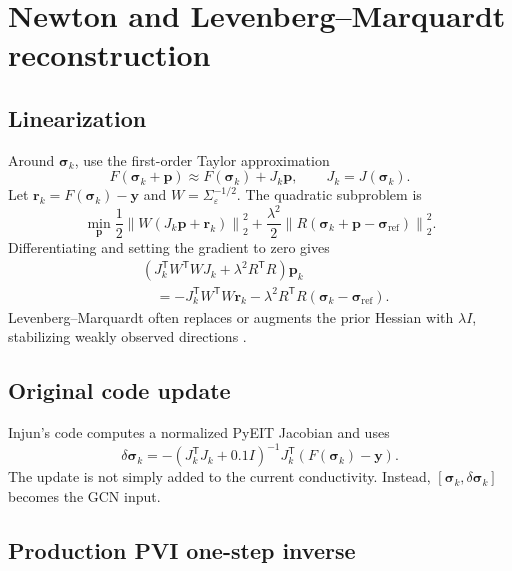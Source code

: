 \documentclass[11pt]{article}
\newcommand{\norm}[1]{\left\lVert #1\right\rVert}
\newcommand{\trans}{^{\mathsf T}}
\newcommand{\sig}{\bm{\sigma}}
\begin{document}
\section{Newton and Levenberg--Marquardt reconstruction}

\subsection{Linearization}

Around $\sig_k$, use the first-order Taylor approximation
\begin{equation}
  F(\sig_k+\bm p)\approx F(\sig_k)+J_k\bm p,
  \qquad J_k=J(\sig_k).
\end{equation}
Let $\bm r_k=F(\sig_k)-\bm y$ and $W=\Sigma_\varepsilon^{-1/2}$.  The quadratic
subproblem is
\begin{equation}
  \min_{\bm p}\frac12\norm{W(J_k\bm p+\bm r_k)}_2^2
  +\frac{\lambda^2}{2}\norm{R(\sig_k+\bm p-\sig_{\mathrm{ref}})}_2^2.
\end{equation}
Differentiating and setting the gradient to zero gives
\begin{equation}
\begin{split}
  &(J_k\trans W\trans WJ_k+\lambda^2R\trans R)\bm p_k\\
  &\quad=-J_k\trans W\trans W\bm r_k
  -\lambda^2R\trans R(\sig_k-\sig_{\mathrm{ref}}).
  \label{eq:gn-normal}
\end{split}
\end{equation}
Levenberg--Marquardt often replaces or augments the prior Hessian with
$\lambda I$, stabilizing weakly observed directions \cite{levenberg1944,marquardt1963}.

\subsection{Original code update}

Injun's code computes a normalized PyEIT Jacobian and uses
\begin{equation}
  \delta\sig_k=-\left(J_k\trans J_k+0.1I\right)^{-1}J_k\trans
  \left(F(\sig_k)-\bm y\right).
  \label{eq:original-lm}
\end{equation}
The update is not simply added to the current conductivity.  Instead,
$[\sig_k,\delta\sig_k]$ becomes the GCN input.

\subsection{Production PVI one-step inverse}
\end{document}
